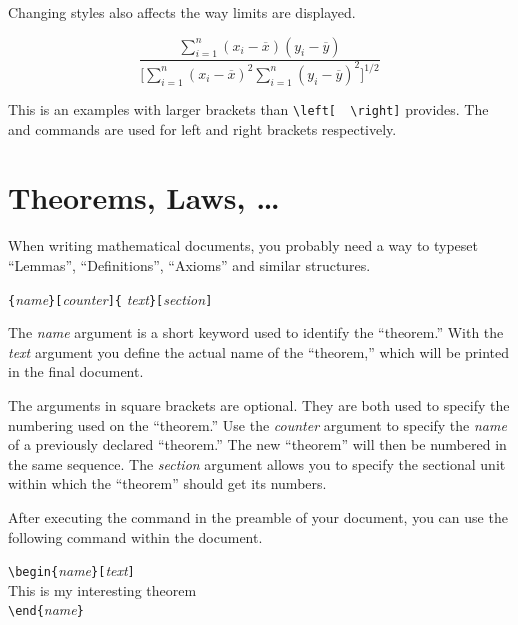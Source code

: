 Changing styles also affects the way limits are displayed.
\begin{example}
\begin{displaymath}
 \frac{\displaystyle 
   \sum_{i=1}^n(x_i-\overline x)
   (y_i-\overline y)} 
  {\displaystyle\biggl[
 \sum_{i=1}^n(x_i-\overline x)^2
\sum_{i=1}^n(y_i-\overline y)^2
\biggr]^{1/2}}
\end{displaymath}    
\end{example}

\noindent This is an examples with larger
brackets than \verb|\left[  \right]| provides. The
 and  commands are used for left and right brackets
respectively.


\section{Theorems, Laws, \ldots}

When writing mathematical documents, you probably need a way to
typeset ``Lemmas'', ``Definitions'', ``Axioms'' and similar
structures.
\begin{lscommand}
\verb|{|\emph{name}\verb|}[|\emph{counter}\verb|]{|%
         \emph{text}\verb|}[|\emph{section}\verb|]|
\end{lscommand}
The \emph{name} argument is a short keyword used to identify the
``theorem.'' With the \emph{text} argument you define the actual name
of the ``theorem,'' which will be printed in the final document.

The arguments in square brackets are optional. They are both used to
specify the numbering used on the ``theorem.'' Use  the \emph{counter}
argument to specify the \emph{name} of a previously declared
``theorem.'' The new ``theorem'' will then be numbered in the same
sequence.  The \emph{section} argument allows you to specify the
sectional unit within which the ``theorem'' should get its numbers.

After executing the  command in the preamble of your
document, you can use the following command within the document.
\begin{code}
\verb|\begin{|\emph{name}\verb|}[|\emph{text}\verb|]|\\
This is my interesting theorem\\
\verb|\end{|\emph{name}\verb|}|     
\end{code}

